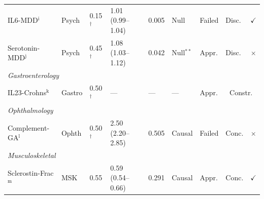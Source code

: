\documentclass[11pt]{article}
\begin{document}
\begin{table}[t]
\begin{tabular}{llllllllc}
IL6-MDD$^\text{i}$ & Psych & 0.15$^\dagger$ & 1.01 (0.99--1.04) & 0.005 & Null & Failed & Disc. & $\checkmark$ \\
Serotonin-MDD$^\text{j}$ & Psych & 0.45$^\dagger$ & 1.08 (1.03--1.12) & 0.042 & Null$^{**}$ & Appr. & Disc. & $\times$ \\
\midrule
\multicolumn{9}{l}{\emph{Gastroenterology}} \\
IL23-Crohns$^\text{k}$ & Gastro & 0.50$^\dagger$ & --- & --- & --- & Appr. & \multicolumn{2}{c}{Constr.} \\
\midrule
\multicolumn{9}{l}{\emph{Ophthalmology}} \\
Complement-GA$^\text{l}$ & Ophth & 0.50$^\dagger$ & 2.50 (2.20--2.85) & 0.505 & Causal & Failed & Conc. & $\times$ \\
\midrule
\multicolumn{9}{l}{\emph{Musculoskeletal}} \\
Sclerostin-Frac$^\text{m}$ & MSK & 0.55 & 0.59 (0.54--0.66) & 0.291 & Causal & Appr. & Conc. & $\checkmark$ \\
\bottomrule
\end{tabular}


\end{table}
\end{document}
